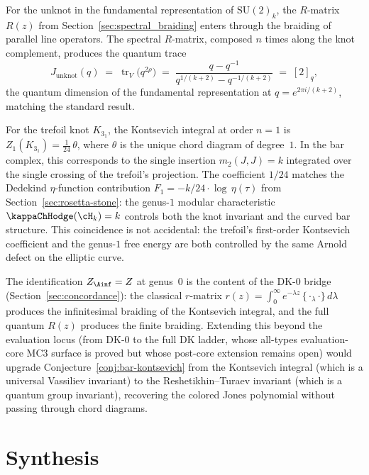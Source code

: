 For the unknot in the fundamental representation of $\mathrm{SU}(2)_k$,
the $R$-matrix $R(z)$ from Section~\ref{sec:spectral_braiding}
enters through the braiding of parallel line operators. The
spectral $R$-matrix, composed $n$ times along the knot complement,
produces the quantum trace
\[
J_{\text{unknot}}(q) \;=\; \operatorname{tr}_V\bigl(
q^{2\rho}\bigr) \;=\; \frac{q - q^{-1}}{q^{1/(k+2)} -
q^{-1/(k+2)}} \;=\; [2]_q,
\]
the quantum dimension of the fundamental representation at
$q = e^{2\pi i/(k+2)}$, matching the standard result.

\begin{remark}
For the trefoil knot $K_{3_1}$, the Kontsevich integral at order
$n = 1$ is
$Z_1(K_{3_1}) = \frac{1}{24}\,\theta$,
where $\theta$ is the unique chord diagram of degree~$1$.
In the bar complex, this corresponds to the single insertion
$m_2(J, J) = k$ integrated over the single crossing of the
trefoil's projection. The coefficient $1/24$ matches the
Dedekind $\eta$-function contribution
$F_1 = -k/24 \cdot \log\,\eta(\tau)$ from
Section~\ref{sec:rosetta-stone}: the genus-$1$ modular
characteristic $\kappaChHodge(\cH_k) = k$ controls both the knot
invariant and the curved bar structure. This coincidence is not
accidental: the trefoil's first-order Kontsevich coefficient and
the genus-$1$ free energy are both controlled by the same
Arnold defect on the elliptic curve.
\end{remark}

\begin{remark}
The identification $Z_{\Ainf} = Z$ at genus~$0$ is the content
of the DK-$0$ bridge
(Section~\ref{sec:concordance}): the classical $r$-matrix
$r(z) = \int_0^\infty e^{-\lambda z}\,\{{\cdot}_\lambda{\cdot}\}
\,d\lambda$ produces the infinitesimal braiding of the Kontsevich
integral, and the full quantum $R(z)$ produces the finite
braiding. Extending this beyond the evaluation locus (from
DK-$0$ to the full DK ladder, whose all-types evaluation-core MC3
surface is proved but whose post-core extension remains open) would upgrade
Conjecture~\ref{conj:bar-kontsevich} from the Kontsevich integral
(which is a universal Vassiliev invariant) to the
Reshetikhin--Turaev invariant (which is a quantum group
invariant), recovering the colored Jones polynomial without
passing through chord diagrams.
\end{remark}

\section{Synthesis}
\label{sec:specbraid-supplement}

